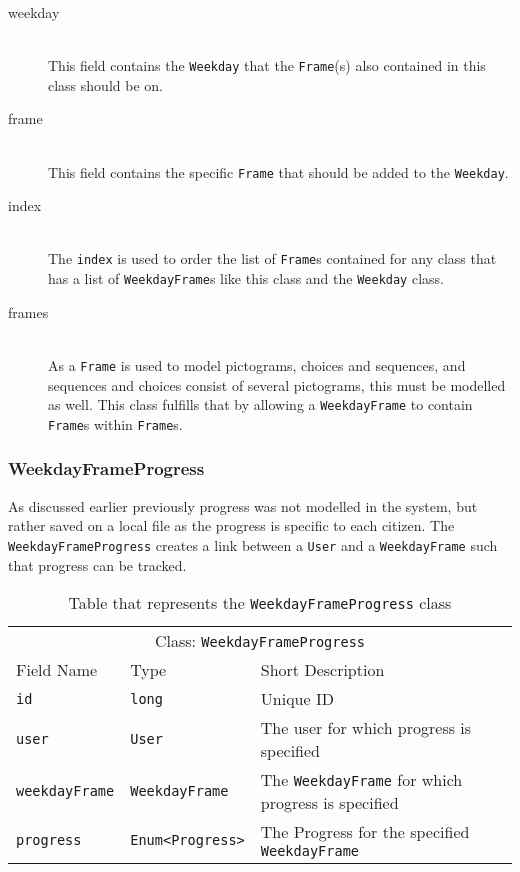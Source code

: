 \begin{description}
    \item [weekday] \hfill \\
    This field contains the \texttt{Weekday} that the \texttt{Frame}(s) also contained in this class should be on.
    \item [frame] \hfill \\
    This field contains the specific \texttt{Frame} that should be added to the \texttt{Weekday}.
    \item [index] \hfill \\
    The \texttt{index} is used to order the list of \texttt{Frame}s contained for any class that has a list of \texttt{WeekdayFrame}s like this class and the \texttt{Weekday} class.
    \item [frames] \hfill \\
    As a \texttt{Frame} is used to model pictograms, choices and sequences, and sequences and choices consist of several pictograms, this must be modelled as well.
    This class fulfills that by allowing a \texttt{WeekdayFrame} to contain \texttt{Frame}s within \texttt{Frame}s.

\end{description}

\subsubsection{WeekdayFrameProgress}
As discussed earlier previously progress was not modelled in the system, but rather saved on a local file as the progress is specific to each citizen.
The \texttt{WeekdayFrameProgress} creates a link between a \texttt{User} and a \texttt{WeekdayFrame} such that progress can be tracked.

\begin{table}[]
\centering
\caption{Table that represents the \texttt{WeekdayFrameProgress} class}
\label{tbl:WeekdayFrameProgress}
\begin{tabular}{lll}
\multicolumn{3}{c}{Class: \texttt{WeekdayFrameProgress}}                                                                        \\
Field Name            & Type                                        & Short Description                                         \\
\texttt{id}           & \texttt{long}                               & Unique ID                                                 \\
\texttt{user}         & \texttt{User}                               & The user for which progress is specified                  \\
\texttt{weekdayFrame} & \texttt{WeekdayFrame}                       & The \texttt{WeekdayFrame} for which progress is specified \\
\texttt{progress}     & \texttt{Enum\textless Progress\textgreater} & The Progress for the specified \texttt{WeekdayFrame}     
\end{tabular}
\end{table}

